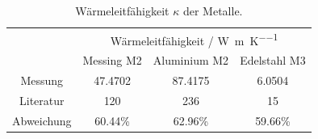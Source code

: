 \begin{table}[htbp]
	\centering
	\begin{tabular}{cccc}
	\toprule
	&\multicolumn{3}{c}{Wärmeleitfähigkeit \kappa \:/ \:\si{\watt\per\meter\per\kelvin}}\\
	&{Messing M2}&{Aluminium M2}&{Edelstahl M3}\\
	\midrule
	{Messung}&{47.4702}& 87.4175&6.0504\\
	{Literatur}&{120}&{236}&15\\
	\midrule
	{Abweichung}&60.44\%&62.96\%&59.66\%\\
	\bottomrule
	\end{tabular}
	\caption{Wärmeleitfähigkeit $\kappa$ der Metalle.}
\label{tab:waermeleitfaehigkeitwerte}
\end{table}